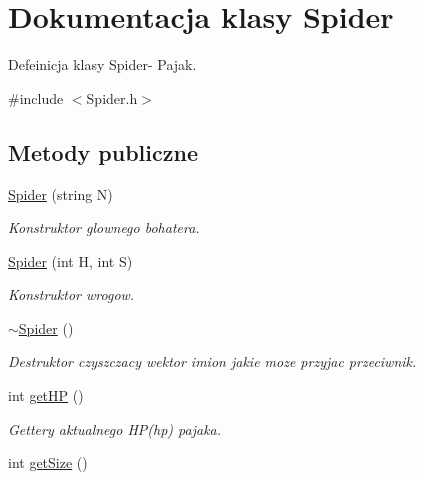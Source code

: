 \hypertarget{class_spider}{}\section{Dokumentacja klasy Spider}
\label{class_spider}


Defeinicja klasy Spider-\/ Pajak.  




{\ttfamily \#include $<$Spider.\+h$>$}

\subsection*{Metody publiczne}
\begin{DoxyCompactItemize}
\item 
\hyperlink{class_spider_a75fc5ed6dd180fc2d33d2dc0f86f3e97}{Spider} (string N)
\begin{DoxyCompactList}\small\item\em Konstruktor glownego bohatera. \end{DoxyCompactList}\item 
\hyperlink{class_spider_a09a7902912619265effef86687c4536b}{Spider} (int H, int S)
\begin{DoxyCompactList}\small\item\em Konstruktor wrogow. \end{DoxyCompactList}\item 
\hyperlink{class_spider_a847823793e44603b84396dfcf3ebce40}{$\sim$\+Spider} ()\hypertarget{class_spider_a847823793e44603b84396dfcf3ebce40}{}\label{class_spider_a847823793e44603b84396dfcf3ebce40}

\begin{DoxyCompactList}\small\item\em Destruktor czyszczacy wektor imion jakie moze przyjac przeciwnik. \end{DoxyCompactList}\item 
int \hyperlink{class_spider_a32edac528e691b9e2e3ee78e8db95863}{get\+HP} ()\hypertarget{class_spider_a32edac528e691b9e2e3ee78e8db95863}{}\label{class_spider_a32edac528e691b9e2e3ee78e8db95863}

\begin{DoxyCompactList}\small\item\em Gettery aktualnego H\+P(hp) pajaka. \end{DoxyCompactList}\item 
int \hyperlink{class_spider_a3d291eab27d175e00f869579bfd1204c}{get\+Size} ()\hypertarget{class_spider_a3d291eab27d175e00f869579bfd1204c}{}\label{class_spider_a3d291eab27d175e00f869579bfd1204c}


\end{DoxyCompactItemize}
